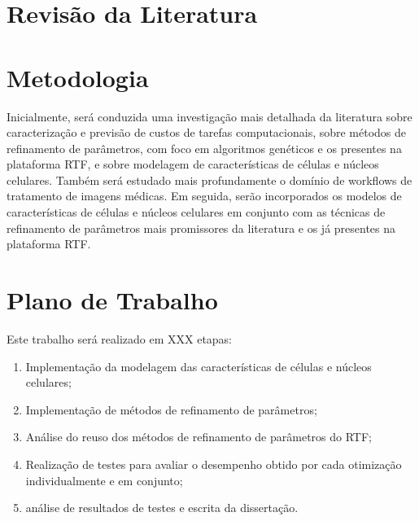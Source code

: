 \documentclass[a4paper,10pt]{article}
\begin{document}
\section{Revisão da Literatura}

\section{Metodologia}
Inicialmente, será conduzida uma investigação mais detalhada da literatura sobre caracterização e previsão de custos de tarefas computacionais, sobre métodos de refinamento de parâmetros, com foco em algoritmos genéticos e os presentes na plataforma RTF, e sobre modelagem de características de células e núcleos celulares. Também será estudado mais profundamente o domínio de workflows de tratamento de imagens médicas. Em seguida, serão incorporados os modelos de características de células e núcleos celulares em conjunto com as técnicas de refinamento de parâmetros mais promissores da literatura e os já presentes na plataforma RTF.

\section{Plano de Trabalho}

Este trabalho será realizado em XXX etapas:
\begin{enumerate}
	\item Implementação da modelagem das características de células e núcleos celulares;
	\item Implementação de métodos de refinamento de parâmetros;
	\item Análise do reuso dos métodos de refinamento de parâmetros do RTF;
	\item Realização de testes para avaliar o desempenho obtido por cada otimização individualmente e em conjunto;
	\item análise de resultados de testes e escrita da dissertação.
\end{enumerate}
\end{document}
